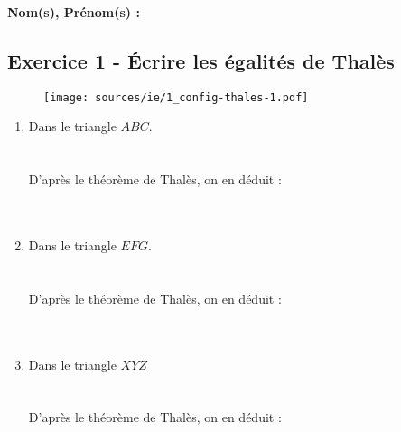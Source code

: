 \documentclass[12pt]{article}
\begin{document}

\setlength{\columnseprule}{1pt}

\textbf{Nom(s), Prénom(s) :}

\subsection*{Exercice 1 - Écrire les égalités de Thalès}

\begin{figure}[H]
  \centering
  \texttt{[image: sources/ie/1\_config-thales-1.pdf]}
\end{figure}

\begin{multicols}{3}
  \begin{enumerate}
  \item Dans le triangle $ABC$.\\ 
  \phantom{abc}\\
  \phantom{abc}\\
  D'après le théorème de Thalès, on en déduit :\\
   \phantom{abc}\\
  \phantom{abc}\\
  \item Dans le triangle $EFG$.\\ 
  \phantom{abc}\\
  \phantom{abc}\\
  D'après le théorème de Thalès, on en déduit :\\
  \phantom{abc}\\
  \phantom{abc}\\
  \item Dans le triangle $XYZ$\\
  \phantom{abc}\\
  \phantom{abc}\\
  D'après le théorème de Thalès, on en déduit :\\
  \phantom{abc}\\
  \phantom{abc}\\
  \end{enumerate}
\end{multicols}

\vspace{0.3cm}
\noindent\hrulefill
\vspace{0.3cm}
\end{document}
